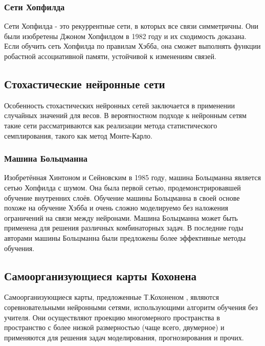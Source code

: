 \documentclass[a4paper,12pt]{report}
\begin{document}
\subsubsection{Сети Хопфилда}
Сети Хопфилда - это рекуррентные сети, в которых все связи симметричны. Они были изобретены Джоном Хопфилдом в 1982 году и их сходимость доказана. Если обучить сеть Хопфилда по правилам Хэбба, она сможет выполнять функции робастной ассоциативной памяти, устойчивой к изменениям связей.

\subsection{Стохастические нейронные сети}
Особенность стохастических нейронных сетей заключается в применении случайных значений для весов. В вероятностном подходе к нейронным сетям такие сети рассматриваются как реализации метода статистического семплирования, такого как метод Монте-Карло.

\subsubsection{Машина Больцманна}
Изобретённая Хинтоном и Сейновским в 1985 году, машина Больцманна является сетью Хопфилда с шумом. Она была первой сетью, продемонстрировавшей обучение внутренних слоёв. Обучение машины Больцманна в своей основе похоже на обучение Хэбба и очень сложно моделируемо без наложения ограничений на связи между нейронами. Машина Больцманна может быть применена для решения различных комбинаторных задач. В последние годы авторами машины Больцманна были предложены более эффективные методы обучения.

\subsection{Самоорганизующиеся карты Кохонена}
Самоорганизующиеся карты, предложенные Т.Кохоненом , являются соревновательными нейронными сетями, использующими алгоритм обучения без учителя. Они осуществляют проекцию многомерного пространства в пространство с более низкой размерностью (чаще всего, двумерное) и применяются для решения задач моделирования, прогнозирования и прочих.
\end{document}
